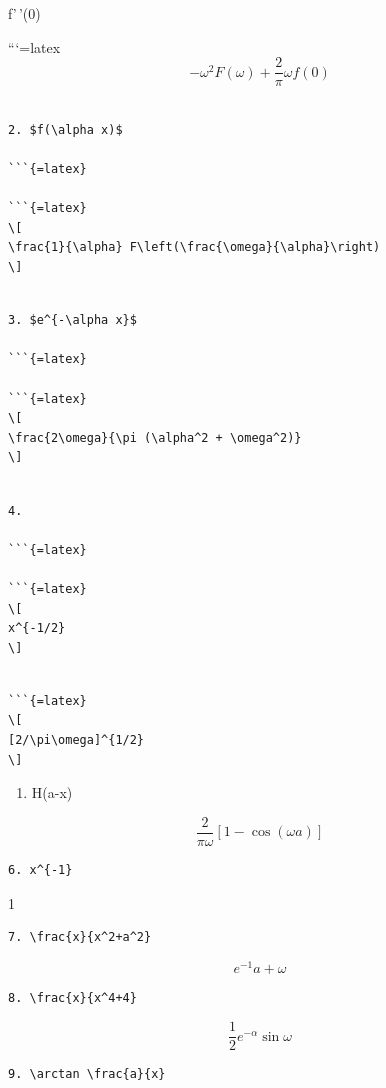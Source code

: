 \documentclass[
]{article}
\providecommand{\tightlist}{%
  \setlength{\itemsep}{0pt}\setlength{\parskip}{0pt}}
\begin{document}
f'\,'(0)

```{=latex}
\[
-\omega^2 F(\omega) + \frac{2}{\pi} \omega f(0)
\]

\begin{verbatim}

2. $f(\alpha x)$ 

```{=latex}

```{=latex}
\[
\frac{1}{\alpha} F\left(\frac{\omega}{\alpha}\right)
\]
\end{verbatim}

\begin{verbatim}

3. $e^{-\alpha x}$ 

```{=latex}

```{=latex}
\[
\frac{2\omega}{\pi (\alpha^2 + \omega^2)}
\]
\end{verbatim}

\begin{verbatim}

4.

```{=latex}

```{=latex}
\[
x^{-1/2}
\]
\end{verbatim}

\begin{verbatim}

```{=latex}
\[
[2/\pi\omega]^{1/2}
\]
\end{verbatim}

\begin{enumerate}
\def\labelenumi{\arabic{enumi}.}
\setcounter{enumi}{4}
\tightlist
\item
  H(a-x)
\end{enumerate}

\[
\frac{2}{\pi\omega} [1-\cos(\omega a)]
\]

\begin{verbatim}
6. x^{-1}
\end{verbatim}

1

\begin{verbatim}
7. \frac{x}{x^2+a^2}
\end{verbatim}

\[
e^{-1}a + \omega
\]

\begin{verbatim}
8. \frac{x}{x^4+4}
\end{verbatim}

\[
\frac{1}{2}e^{-\alpha}\sin\omega
\]

\begin{verbatim}
9. \arctan \frac{a}{x}
\end{verbatim}
\end{document}

